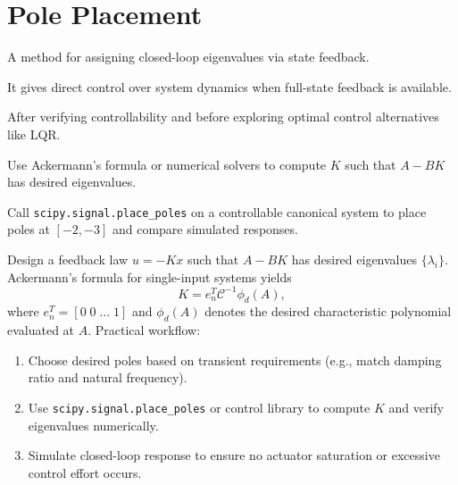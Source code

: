 \section{Pole Placement}
\begin{beginnerguide}
    \item[\textbf{What?}] A method for assigning closed-loop eigenvalues via state feedback.
    \item[\textbf{Why?}] It gives direct control over system dynamics when full-state feedback is available.
    \item[\textbf{When?}] After verifying controllability and before exploring optimal control alternatives like LQR.
    \item[\textbf{How?}] Use Ackermann’s formula or numerical solvers to compute $K$ such that $A-BK$ has desired eigenvalues.
    \item[\textbf{Example}] Call \texttt{scipy.signal.place\_poles} on a controllable canonical system to place poles at $[-2,-3]$ and compare simulated responses.
\end{beginnerguide}
Design a feedback law $u = -K x$ such that $A - B K$ has desired eigenvalues $\{\lambda_i\}$. Ackermann's formula for single-input systems yields
\begin{equation}
    K = e_n^T \mathcal{C}^{-1} \phi_d(A),
\end{equation}
where $e_n^T = [0\; 0\; \dots\; 1]$ and $\phi_d(A)$ denotes the desired characteristic polynomial evaluated at $A$. Practical workflow:
\begin{enumerate}[leftmargin=*]
    \item Choose desired poles based on transient requirements (e.g., match damping ratio and natural frequency).
    \item Use \texttt{scipy.signal.place\_poles} or control library to compute $K$ and verify eigenvalues numerically.
    \item Simulate closed-loop response to ensure no actuator saturation or excessive control effort occurs.
\end{enumerate}

